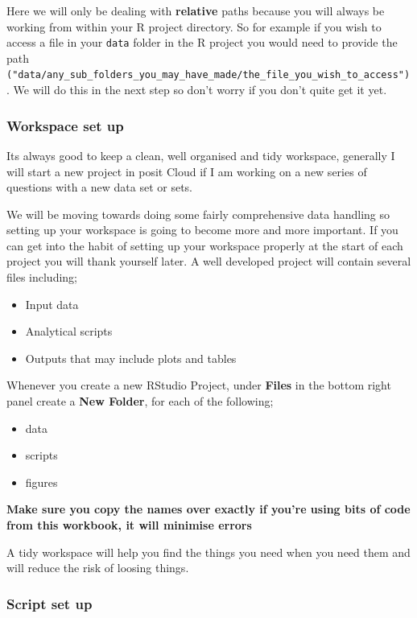 \documentclass[
]{book}
\providecommand{\tightlist}{%
  \setlength{\itemsep}{0pt}\setlength{\parskip}{0pt}}
\begin{document}
Here we will only be dealing with \textbf{relative} paths because you will always be working from within your R project directory. So for example if you wish to access a file in your \texttt{data} folder in the R project you would need to provide the path \texttt{("data/any\_sub\_folders\_you\_may\_have\_made/the\_file\_you\_wish\_to\_access")}. We will do this in the next step so don't worry if you don't quite get it yet.

\subsubsection{Workspace set up}\label{workspace-setup}

Its always good to keep a clean, well organised and tidy workspace, generally I will start a new project in posit Cloud if I am working on a new series of questions with a new data set or sets.

We will be moving towards doing some fairly comprehensive data handling so setting up your workspace is going to become more and more important. If you can get into the habit of setting up your workspace properly at the start of each project you will thank yourself later. A well developed project will contain several files including;

\begin{itemize}
\tightlist
\item
  Input data
\item
  Analytical scripts
\item
  Outputs that may include plots and tables
\end{itemize}

Whenever you create a new RStudio Project, under \textbf{Files} in the bottom right panel create a \textbf{New Folder}, for each of the following;

\begin{itemize}
\tightlist
\item
  data
\item
  scripts
\item
  figures
\end{itemize}

\textbf{Make sure you copy the names over exactly if you're using bits of code from this workbook, it will minimise errors}

A tidy workspace will help you find the things you need when you need them and will reduce the risk of loosing things.

\subsubsection{Script set up}\label{script-setup}
\end{document}
